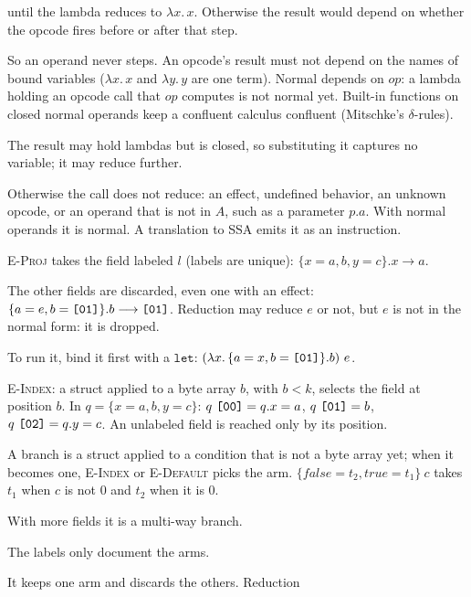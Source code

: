 \documentclass[11pt,letterpaper]{article}
\newcommand{\step}{\mathrel{\longrightarrow}}     %
\newcommand{\lam}[2]{\lambda #1.\,#2}       %
\newcommand{\fn}[1]{\mathit{#1}}                %
\newcommand{\rn}[1]{\textsc{#1}}                %
\newcommand{\kw}[1]{\mathtt{#1}}
\newcommand{\hex}[1]{\text{\ttfamily [#1]}}  %
\newcounter{pt}
\begin{document}
\begin{points}
\begin{subpoints}
    until the lambda reduces to $\lam{x}{x}$. Otherwise the result would depend on whether the opcode fires
    before or after that step.
  \item So an operand never steps. An opcode's result must not depend on the names of bound variables
    ($\lam{x}{x}$ and $\lam{y}{y}$ are one term). Normal depends on $\fn{op}$: a lambda holding an opcode call
    that $\fn{op}$ computes is not normal yet. Built-in functions
    on closed normal operands keep a confluent calculus confluent (Mitschke's $\delta$-rules).
  \item The result may hold lambdas but is closed, so substituting it captures no variable; it may
    reduce further.
  \item Otherwise the call does not reduce: an effect, undefined behavior, an unknown opcode, or an
    operand that is not in $A$, such as a parameter $p.a$. With normal operands it is normal. A translation to SSA emits it as an instruction.
    \end{subpoints}
\item \rn{E-Proj} takes the field labeled $l$ (labels are unique): $\{x = a, b, y = c\}.x \step a$.
  \begin{subpoints}
  \item The other fields are discarded, even one with an effect:
    $\{a = e, b = \hex{01}\}.b \step \hex{01}$. Reduction may
    reduce $e$ or not, but $e$ is not in the normal form: it is dropped.
  \item To run it, bind it first with a $\kw{let}$:
    $(\lam{x}{\{a = x, b = \hex{01}\}.b})\ e$.
    \end{subpoints}
\item \rn{E-Index}: a struct applied to a byte array $b$, with $b < k$, selects the field at position $b$.
  In $q = \{x = a, b, y = c\}$: $q\ \hex{00} = q.x = a$, $q\ \hex{01} = b$,
  $q\ \hex{02} = q.y = c$. An unlabeled field is reached only by its position.
  \begin{subpoints}
    \item\label{p:branch} A branch is a struct applied to a condition that is not a byte array yet; when it
    becomes one, \rn{E-Index} or \rn{E-Default} picks the arm.
    $\{\mathit{false} = t_2, \mathit{true} = t_1\}\ c$ takes $t_1$ when $c$ is
    not $0$ and $t_2$ when it is $0$.
  \item With more fields it is a multi-way branch.
  \item The labels only document the arms.
  \item It keeps one arm and discards the others. Reduction

\end{subpoints}
\end{points}
\end{document}
